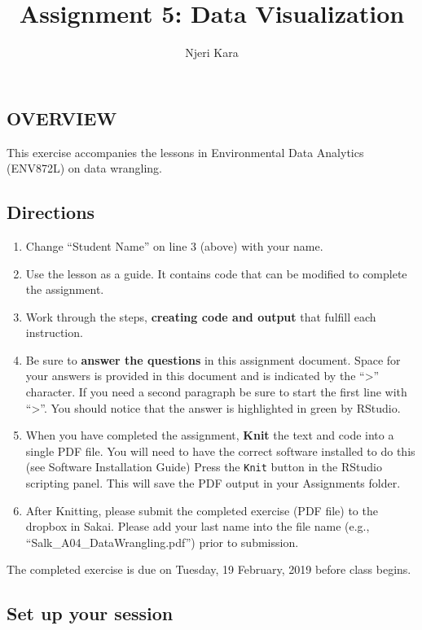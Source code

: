 \documentclass[]{article}
\title{Assignment 5: Data Visualization}
\author{Njeri Kara}
\date{}
\providecommand{\tightlist}{%
  \setlength{\itemsep}{0pt}\setlength{\parskip}{0pt}}
\begin{document}
\maketitle

\subsection{OVERVIEW}\label{overview}

This exercise accompanies the lessons in Environmental Data Analytics
(ENV872L) on data wrangling.

\subsection{Directions}\label{directions}

\begin{enumerate}
\def\labelenumi{\arabic{enumi}.}
\tightlist
\item
  Change ``Student Name'' on line 3 (above) with your name.
\item
  Use the lesson as a guide. It contains code that can be modified to
  complete the assignment.
\item
  Work through the steps, \textbf{creating code and output} that fulfill
  each instruction.
\item
  Be sure to \textbf{answer the questions} in this assignment document.
  Space for your answers is provided in this document and is indicated
  by the ``\textgreater{}'' character. If you need a second paragraph be
  sure to start the first line with ``\textgreater{}''. You should
  notice that the answer is highlighted in green by RStudio.
\item
  When you have completed the assignment, \textbf{Knit} the text and
  code into a single PDF file. You will need to have the correct
  software installed to do this (see Software Installation Guide) Press
  the \texttt{Knit} button in the RStudio scripting panel. This will
  save the PDF output in your Assignments folder.
\item
  After Knitting, please submit the completed exercise (PDF file) to the
  dropbox in Sakai. Please add your last name into the file name (e.g.,
  ``Salk\_A04\_DataWrangling.pdf'') prior to submission.
\end{enumerate}

The completed exercise is due on Tuesday, 19 February, 2019 before class
begins.

\subsection{Set up your session}\label{set-up-your-session}
\end{document}
